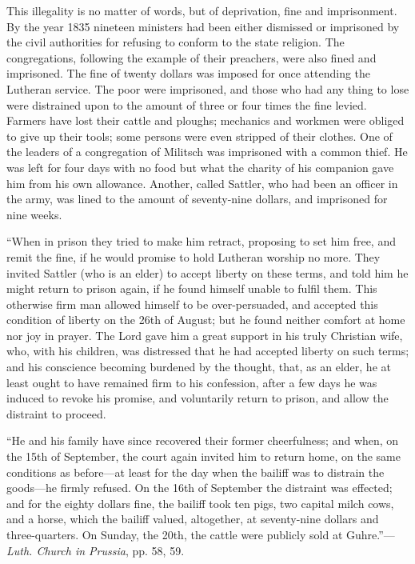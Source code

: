 This illegality is no matter of words, but of
deprivation, fine and imprisonment. By the year 1835 nineteen ministers
had been either dismissed or imprisoned by the civil authorities for
refusing to conform to the state religion. The congregations, following
the example of their preachers, were also fined and imprisoned. The fine
of twenty dollars was imposed for once attending the Lutheran service.
The poor were imprisoned, and those who had any thing to lose were
distrained upon to the amount of three or four times the fine levied.
Farmers have lost their cattle and ploughs; mechanics and workmen were
obliged to give up their tools; some persons were even stripped of their
clothes. One of the leaders of a congregation of Militsch was imprisoned
with a common thief. He was left for four days with no food but what the
charity of his companion gave him from his own allowance. Another,
called Sattler, who had been an officer in the army, was lined to the
amount of seventy-nine dollars, and imprisoned for nine weeks.

``When in prison they tried to make
him retract, proposing to set him free, and remit the fine, if he would
promise to hold Lutheran worship no more. They invited Sattler (who is
an elder) to accept liberty on these terms, and told him he might return
to prison again, if he found himself unable to fulfil them. This
otherwise firm man allowed himself to be over-persuaded, and accepted
this condition of liberty on the 26th of August; but he found neither
comfort at home nor joy in prayer. The Lord gave him a great support in
his truly Christian wife, who, with his children, was distressed that he
had accepted liberty on such terms; and his conscience becoming burdened
by the thought, that, as an elder, he at least ought to have remained
firm to his confession, after a few days he was induced to revoke his
promise, and voluntarily return to prison, and allow the distraint to
proceed.

``He and his family have since
recovered their former cheerfulness; and when, on the 15th of September,
the court again invited him to return home, on the same conditions as
before—at least for the day when the bailiff was to distrain the
goods—he firmly refused. On the 16th of September the distraint was
effected; and for the eighty dollars fine, the bailiff took ten pigs,
two capital milch cows, and a horse, which the bailiff valued,
altogether, at seventy-nine dollars and three-quarters. On Sunday,
the 20th, the cattle were publicly sold at Guhre.''—\emph{Luth. Church in
Prussia}, pp. 58, 59.

